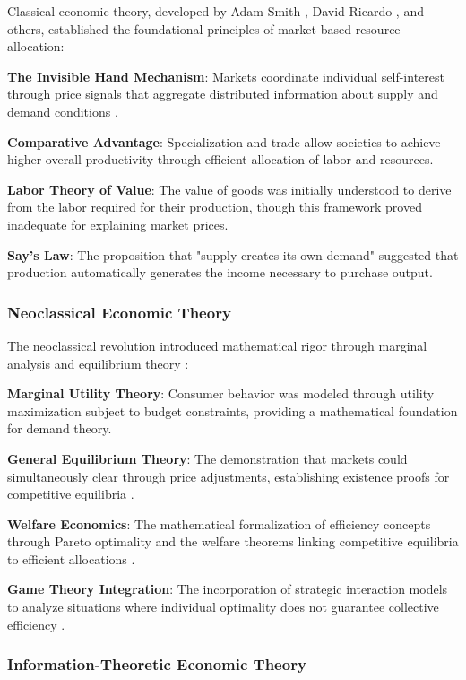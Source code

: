 \documentclass[12pt,a4paper]{article}
\begin{document}
Classical economic theory, developed by Adam Smith \cite{smith1776}, David Ricardo \cite{ricardo1817}, and others, established the foundational principles of market-based resource allocation:

\textbf{The Invisible Hand Mechanism}: Markets coordinate individual self-interest through price signals that aggregate distributed information about supply and demand conditions \cite{hayek1945}.

\textbf{Comparative Advantage}: Specialization and trade allow societies to achieve higher overall productivity through efficient allocation of labor and resources.

\textbf{Labor Theory of Value}: The value of goods was initially understood to derive from the labor required for their production, though this framework proved inadequate for explaining market prices.

\textbf{Say's Law}: The proposition that "supply creates its own demand" suggested that production automatically generates the income necessary to purchase output.

\subsubsection{Neoclassical Economic Theory}

The neoclassical revolution introduced mathematical rigor through marginal analysis and equilibrium theory \cite{marshall1890,walras1874,pareto1906}:

\textbf{Marginal Utility Theory}: Consumer behavior was modeled through utility maximization subject to budget constraints, providing a mathematical foundation for demand theory.

\textbf{General Equilibrium Theory}: The demonstration that markets could simultaneously clear through price adjustments, establishing existence proofs for competitive equilibria \cite{arrow1951,debreu1959}.

\textbf{Welfare Economics}: The mathematical formalization of efficiency concepts through Pareto optimality and the welfare theorems linking competitive equilibria to efficient allocations \cite{samuelson1947,hicks1939}.

\textbf{Game Theory Integration}: The incorporation of strategic interaction models to analyze situations where individual optimality does not guarantee collective efficiency \cite{von_neumann1944,nash1950}.

\subsubsection{Information-Theoretic Economic Theory}
\end{document}
